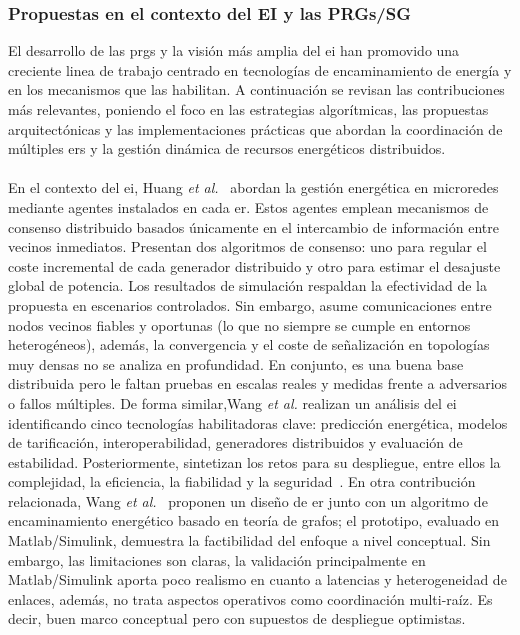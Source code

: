 \subsubsection{Propuestas en el contexto del EI y las PRGs/SG}
\label{subsubsec:propuestas_sg}

El desarrollo de las \glspl{prg} y la visión más amplia del \gls{ei} han promovido una creciente linea de trabajo centrado en tecnologías de encaminamiento de energía y en los mecanismos que las habilitan. A continuación se revisan las contribuciones más relevantes, poniendo el foco en las estrategias algorítmicas, las propuestas arquitectónicas y las implementaciones prácticas que abordan la coordinación de múltiples \glspl{er} y la gestión dinámica de recursos energéticos distribuidos.\\
\\
En el contexto del \gls{ei}, Huang \textit{et al.}~\cite{Huang16} abordan la gestión energética en microredes mediante agentes instalados en cada \gls{er}. Estos agentes emplean mecanismos de consenso distribuido basados únicamente en el intercambio de información entre vecinos inmediatos. Presentan dos algoritmos de consenso: uno para regular el coste incremental de cada generador distribuido y otro para estimar el desajuste global de potencia. Los resultados de simulación respaldan la efectividad de la propuesta en escenarios controlados. Sin embargo, asume comunicaciones entre nodos vecinos fiables y oportunas (lo que no siempre se cumple en entornos heterogéneos), además, la convergencia y el coste de señalización en topologías muy densas no se analiza en profundidad. En conjunto, es una buena base distribuida pero le faltan pruebas en escalas reales y medidas frente a adversarios o fallos múltiples. De forma similar,Wang \textit{et al.} realizan un análisis del \gls{ei} identificando cinco tecnologías habilitadoras clave: predicción energética, modelos de tarificación, interoperabilidad, generadores distribuidos y evaluación de estabilidad. Posteriormente, sintetizan los retos para su despliegue, entre ellos la complejidad, la eficiencia, la fiabilidad y la seguridad~\cite{wang17-2}. En otra contribución relacionada, Wang \textit{et al.}~\cite{Wang17-1} proponen un diseño de \gls{er} junto con un algoritmo de encaminamiento energético basado en teoría de grafos; el prototipo, evaluado en Matlab/Simulink, demuestra la factibilidad del enfoque a nivel conceptual. Sin embargo, las limitaciones son claras, la validación principalmente en Matlab/Simulink aporta poco realismo en cuanto a latencias y heterogeneidad de enlaces, además, no trata aspectos operativos como coordinación multi-raíz. Es decir, buen marco conceptual pero con supuestos de despliegue optimistas.\\
